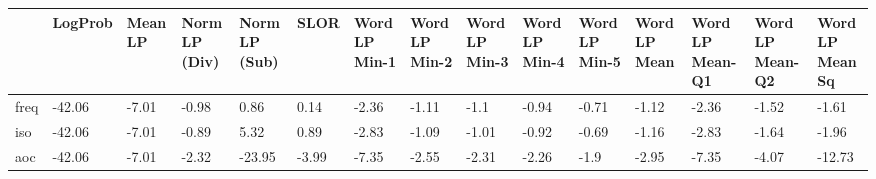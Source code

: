 \begin{tabular}{lllllllllllllll}
\toprule
 & LogProb & Mean LP & Norm LP (Div) & Norm LP (Sub) & SLOR & Word LP Min-1 & Word LP Min-2 & Word LP Min-3 & Word LP Min-4 & Word LP Min-5 & Word LP Mean & Word LP Mean-Q1 & Word LP Mean-Q2 & Word LP Mean Sq \\
\midrule
freq & -42.06 & -7.01 & -0.98 & 0.86 & 0.14 & -2.36 & -1.11 & -1.1 & -0.94 & -0.71 & -1.12 & -2.36 & -1.52 & -1.61 \\
iso & -42.06 & -7.01 & -0.89 & 5.32 & 0.89 & -2.83 & -1.09 & -1.01 & -0.92 & -0.69 & -1.16 & -2.83 & -1.64 & -1.96 \\
aoc & -42.06 & -7.01 & -2.32 & -23.95 & -3.99 & -7.35 & -2.55 & -2.31 & -2.26 & -1.9 & -2.95 & -7.35 & -4.07 & -12.73 \\
\bottomrule
\end{tabular}
